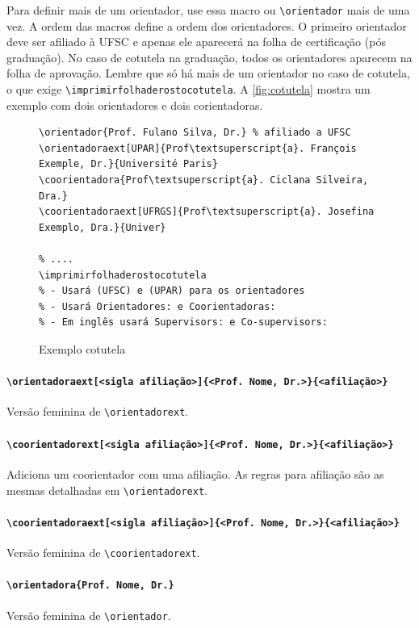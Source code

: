\documentclass[embeddedlogo]{ufsc-thesis-rn46-2019}
\newcommand{\lacmd}[1]{\texttt{\textbackslash{}#1}}
\begin{document}
Para definir mais de um orientador, use essa macro ou \lacmd{orientador} mais de
uma vez. A ordem das macros define a ordem dos orientadores. O primeiro
orientador deve ser afiliado à UFSC e apenas ele aparecerá na folha de
certificação (pós graduação). No caso de cotutela na graduação, todos os
orientadores aparecem na folha de aprovação. Lembre que só há mais de um
orientador no caso de cotutela, o que exige
\lacmd{imprimirfolhaderostocotutela}. A \autoref{fig:cotutela} mostra um exemplo
com dois orientadores e dois corientadoras.

\begin{figure}[tb]
  \centering
\begin{verbatim}
\orientador{Prof. Fulano Silva, Dr.} % afiliado a UFSC
\orientadoraext[UPAR]{Prof\textsuperscript{a}. François Exemple, Dr.}{Université Paris}
\coorientadora{Prof\textsuperscript{a}. Ciclana Silveira, Dra.}
\coorientadoraext[UFRGS]{Prof\textsuperscript{a}. Josefina Exemplo, Dra.}{Univer}

% .... 
\imprimirfolhaderostocotutela
% - Usará (UFSC) e (UPAR) para os orientadores
% - Usará Orientadores: e Coorientadoras:
% - Em inglês usará Supervisors: e Co-supervisors:
\end{verbatim}
  \caption{Exemplo cotutela}
  \label{fig:cotutela}
\end{figure}

\paragraph*{\lacmd{orientadoraext[<sigla afiliação>]\{<Prof. Nome, Dr.>\}\{<afiliação>\}}}
Versão feminina de \lacmd{orientadorext}.

\paragraph*{\lacmd{coorientadorext[<sigla afiliação>]\{<Prof. Nome, Dr.>\}\{<afiliação>\}}}
Adiciona um coorientador com uma afiliação. As regras para afiliação são as mesmas
detalhadas em \lacmd{orientadorext}.

\paragraph*{\lacmd{coorientadoraext[<sigla afiliação>]\{<Prof. Nome, Dr.>\}\{<afiliação>\}}}
Versão feminina de \lacmd{coorientadorext}.

\paragraph*{\lacmd{orientadora\{Prof. Nome, Dr.\}}} Versão feminina de \lacmd{orientador}.
\end{document}
